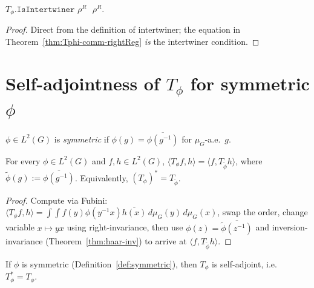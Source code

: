 \begin{corollary}
  \label{cor:Tphi-intertwiner}
  \leanok
  $T_\phi.\texttt{IsIntertwiner $\rho^R$ $\rho^R$}$.
\end{corollary}

\begin{proof}
  Direct from the definition of intertwiner; the equation in
  Theorem~\ref{thm:Tphi-comm-rightReg} \emph{is} the intertwiner
  condition.
\end{proof}

\section{Self-adjointness of \texorpdfstring{$T_\phi$ for symmetric $\phi$}{T\_phi for symmetric phi}}

\begin{definition}
  \label{def:symmetric}
  \leanok
  $\phi \in L^2(G)$ is \emph{symmetric} if
  $\phi(g) = \overline{\phi(g^{-1})}$ for $\mu_G$-a.e.\ $g$.
\end{definition}

\begin{theorem}
  \label{thm:Tphi-adj}
  For every $\phi \in L^2(G)$ and $f, h \in L^2(G)$,
  $\langle T_\phi f, h\rangle =
   \langle f, T_{\widetilde\phi} h\rangle$,
  where $\widetilde\phi(g) := \overline{\phi(g^{-1})}$.
  Equivalently, $(T_\phi)^* = T_{\widetilde\phi}$.
\end{theorem}

\begin{proof}
  Compute via Fubini:
  $\langle T_\phi f, h\rangle =
   \int\int f(y) \phi(y^{-1}x) \overline{h(x)}\,d\mu_G(y)\,d\mu_G(x)$,
  swap the order, change variable $x \mapsto y x$ using right-invariance,
  then use $\phi(z) = \overline{\widetilde\phi(z^{-1})}$ and inversion-invariance
  (Theorem~\ref{thm:haar-inv}) to arrive at $\langle f, T_{\widetilde\phi} h\rangle$.
\end{proof}

\begin{corollary}
  \label{cor:Tphi-selfadj}
  If $\phi$ is symmetric (Definition~\ref{def:symmetric}), then
  $T_\phi$ is self-adjoint, i.e.\
  $T_\phi^* = T_\phi$.
\end{corollary}

